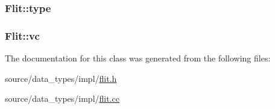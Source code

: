 \hypertarget{classFlit_1a9a073876b8ac18b92e2b1b0eff33d7}{
\subsubsection[{type}]{ {\bf Flit::type}}}
\label{classFlit_1a9a073876b8ac18b92e2b1b0eff33d7}


\hypertarget{classFlit_784536ac677ec8b4f2924bd91fbfa4c2}{
\subsubsection[{vc}]{ {\bf Flit::vc}}}
\label{classFlit_784536ac677ec8b4f2924bd91fbfa4c2}




The documentation for this class was generated from the following files:\begin{CompactItemize}
\item 
source/data\_\-types/impl/\hyperlink{flit_8h}{flit.h}\item 
source/data\_\-types/impl/\hyperlink{flit_8cc}{flit.cc}\end{CompactItemize}
